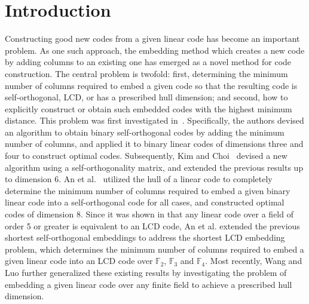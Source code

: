 \documentclass{article}
\theoremstyle{definition}
\theoremstyle{remark}
\begin{document}
\section{Introduction}
Constructing good new codes from a given linear code has become an important problem. As one such approach, the embedding method which creates a new code by adding columns to an existing one has emerged as a novel method for code construction. The central problem is twofold: first, determining the minimum number of columns required to embed a given code so that the resulting code is self-orthogonal, LCD, or has a prescribed hull dimension; and second, how to explicitly construct or obtain such embedded codes with the highest minimum distance. This problem was first investigated in~\cite{KKL-2021}. Specifically, the authors devised an algorithm to obtain binary self-orthogonal codes by adding the minimum number of columns, and applied it to binary linear codes of dimensions three and four to construct optimal codes. Subsequently, Kim and Choi~\cite{KC-2022} devised a new algorithm using a self-orthogonality matrix, and extended the previous results up to dimension 6. An et al.~\cite{AKKLW-arXiv} utilized the hull of a linear code to completely determine the minimum number of columns required to embed a given binary linear code into a self-orthogonal code for all cases, and constructed optimal codes of dimension $8$. Since it was shown in \cite{CMTQP-2018-2} that any linear code over a field of order 5 or greater is equivalent to an LCD code, An et al. \cite{AHKL-arXiv} extended the previous shortest self-orthogonal embeddings to address the shortest LCD embedding problem, which determines the minimum number of columns required to embed a given linear code into an LCD code over $\mathbb{F}_2$, $\mathbb{F}_3$ and $\mathbb{F}_4$. Most recently, Wang and Luo \cite{WL-arXiv} further generalized these existing results by investigating the problem of embedding a given linear code over any finite field to achieve a prescribed hull dimension.
\end{document}
